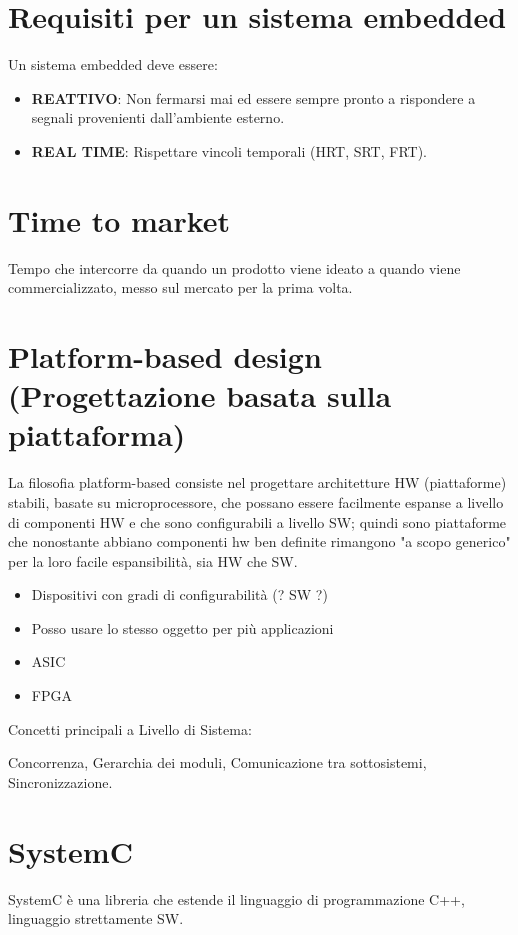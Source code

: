 \documentclass[a4paper]{article}
\theoremstyle{definition}
\begin{document}
	\section{Requisiti per un sistema embedded}
	Un sistema embedded deve essere:
	\begin{itemize}
		\item \textbf{REATTIVO}: Non fermarsi mai ed essere sempre pronto a rispondere a segnali provenienti dall'ambiente esterno.
		\item \textbf{REAL TIME}: Rispettare vincoli temporali (HRT, SRT, FRT).
	\end{itemize}
	
	
	\section{Time to market}
		Tempo che intercorre da quando un prodotto viene ideato a quando viene commercializzato, messo sul mercato per la prima volta.


	\section{Platform-based design (Progettazione basata sulla piattaforma)}
		La filosofia platform-based consiste nel progettare architetture HW (piattaforme) stabili, basate su microprocessore, che possano essere facilmente espanse a livello di componenti HW e che sono configurabili a livello SW; quindi sono piattaforme che nonostante abbiano componenti hw ben definite rimangono "a scopo generico" per la loro facile espansibilità, sia HW che SW.

		
		\begin{itemize}
			\item Dispositivi con gradi di configurabilità (? SW ?)
			\item Posso usare lo stesso oggetto per più applicazioni 
			\item ASIC
			\item FPGA 
		\end{itemize}
	
	Concetti principali a Livello di Sistema:
	
	Concorrenza, Gerarchia dei moduli, Comunicazione tra sottosistemi, Sincronizzazione.
	
	\section{SystemC}
		SystemC è una libreria che estende il linguaggio di programmazione C++, linguaggio strettamente SW.
		\bigskip
		
\end{document}
